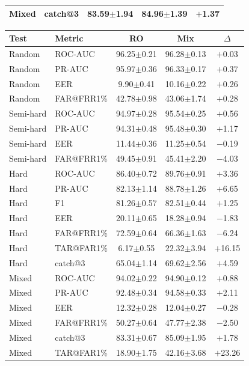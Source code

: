\documentclass[11pt]{article}
\begin{document}
\begin{table}[!t]
\begin{minipage}[t]{0.48\textwidth}
\begin{tabular}{l l c c c}
Mixed     & catch@3    & 83.59$\pm$1.94 & 84.96$\pm$1.39 & $+$1.37 \\
\bottomrule
\end{tabular}
\label{tab:app_wc_distilbert}
\end{minipage}%
\hfill
\begin{minipage}[t]{0.48\textwidth}
\centering
\begin{tabular}{l l c c c}
\toprule
\textbf{Test} & \textbf{Metric} & \textbf{RO} & \textbf{Mix} & \textbf{$\Delta$} \\
\midrule
Random    & ROC-AUC    & 96.25$\pm$0.21 & 96.28$\pm$0.13 & $+$0.03 \\
Random    & PR-AUC     & 95.97$\pm$0.36 & 96.33$\pm$0.17 & $+$0.37 \\
Random    & EER        & \phantom{0}9.90$\pm$0.41 & 10.16$\pm$0.22 & $+$0.26 \\
Random    & FAR@FRR1\% & 42.78$\pm$0.98 & 43.06$\pm$1.74 & $+$0.28 \\
\midrule
Semi-hard & ROC-AUC    & 94.97$\pm$0.28 & 95.54$\pm$0.25 & $+$0.56 \\
Semi-hard & PR-AUC     & 94.31$\pm$0.48 & 95.48$\pm$0.30 & $+$1.17 \\
Semi-hard & EER        & 11.44$\pm$0.36 & 11.25$\pm$0.54 & $-$0.19 \\
Semi-hard & FAR@FRR1\% & 49.45$\pm$0.91 & 45.41$\pm$2.20 & $-$4.03 \\
\midrule
Hard      & ROC-AUC    & 86.40$\pm$0.72 & 89.76$\pm$0.91 & $+$3.36 \\
Hard      & PR-AUC     & 82.13$\pm$1.14 & 88.78$\pm$1.26 & $+$6.65 \\
Hard      & F1         & 81.26$\pm$0.57 & 82.51$\pm$0.44 & $+$1.25 \\
Hard      & EER        & 20.11$\pm$0.65 & 18.28$\pm$0.94 & $-$1.83 \\
Hard      & FAR@FRR1\% & 72.59$\pm$0.64 & 66.36$\pm$1.63 & $-$6.24 \\
Hard      & TAR@FAR1\% & \phantom{0}6.17$\pm$0.55 & 22.32$\pm$3.94 & $+$16.15 \\
Hard      & catch@3    & 65.04$\pm$1.14 & 69.62$\pm$2.56 & $+$4.59 \\
\midrule
Mixed     & ROC-AUC    & 94.02$\pm$0.22 & 94.90$\pm$0.12 & $+$0.88 \\
Mixed     & PR-AUC     & 92.48$\pm$0.34 & 94.58$\pm$0.33 & $+$2.11 \\
Mixed     & EER        & 12.32$\pm$0.28 & 12.04$\pm$0.27 & $-$0.28 \\
Mixed     & FAR@FRR1\% & 50.27$\pm$0.64 & 47.77$\pm$2.38 & $-$2.50 \\
Mixed     & catch@3    & 83.31$\pm$0.67 & 85.09$\pm$1.95 & $+$1.78 \\
Mixed     & TAR@FAR1\% & 18.90$\pm$1.75 & 42.16$\pm$3.68 & $+$23.26 \\
\bottomrule
\end{tabular}
\label{tab:app_wc_bert}
\end{minipage}


\end{table}
\end{document}
